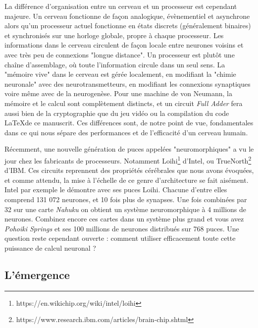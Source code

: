 	La différence d'organisation entre un cerveau et un processeur est cependant majeure. Un cerveau fonctionne de façon analogique, évènementiel et asynchrone alors qu'un processeur actuel fonctionne en états discrets (généralement binaires) et synchronisés sur une horloge globale, propre à chaque processeur. Les informations dans le cerveau circulent de façon locale entre neurones voisins et avec très peu de connexions "longue distance". Un processeur est plutôt une chaîne d'assemblage, où toute l'information circule dans un seul sens. La "mémoire vive" dans le cerveau est gérée localement, en modifiant la "chimie neuronale" avec des neurotransmetteurs, en modifiant les connexions synaptiques voire même avec de la neurogenèse. Pour une machine de von Neumann, la mémoire et le calcul sont complètement distincts, et un circuit \textit{Full Adder} fera aussi bien de la cryptographie que du jeu vidéo ou la compilation du code \LaTeX de ce manuscrit. Ces différences sont, de notre point de vue, fondamentales dans ce qui nous sépare des performances et de l'efficacité d'un cerveau humain.

	Récemment, une nouvelle génération de puces appelées "neuromorphiques" a vu le jour chez les fabricants de processeurs. Notamment Loihi\footnote{https://en.wikichip.org/wiki/intel/loihi} d'Intel, ou TrueNorth\footnote{https://www.research.ibm.com/articles/brain-chip.shtml} d'IBM. Ces circuits reprennent des propriétés cérébrales que nous avons évoquées, et comme attendu, la mise à l'échelle de ce genre d'architecture se fait aisément. Intel par exemple le démontre avec ses puces Loihi. Chacune d'entre elles comprend 131 072 neurones, et 10 fois plus de synapses. Une fois combinées par 32 sur une carte \textit{Nahuku} on obtient un système neuromorphique à 4 millions de neurones. Combinez encore ces cartes dans un système plus grand et vous avez \textit{Pohoiki Springs} et ses 100 millions de neurones distribués sur 768 puces. Une question reste cependant ouverte : comment utiliser efficacement toute cette puissance de calcul neuronal ?

\subsection{L'émergence}

